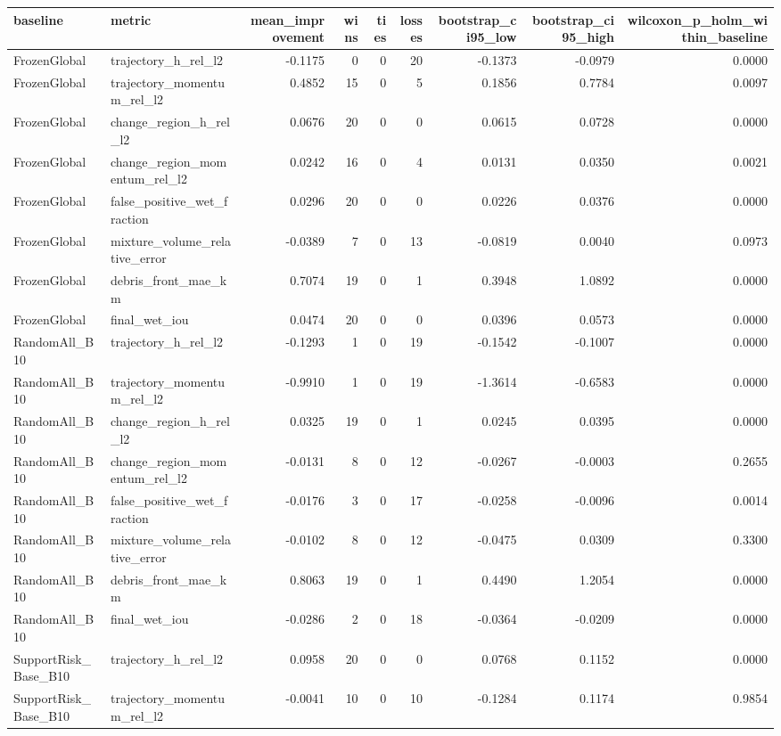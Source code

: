 \begin{tabular}{llrrrrrrr}
\toprule
baseline & metric & mean\_improvement & wins & ties & losses & bootstrap\_ci95\_low & bootstrap\_ci95\_high & wilcoxon\_p\_holm\_within\_baseline \\
\midrule
FrozenGlobal & trajectory\_h\_rel\_l2 & -0.1175 & 0 & 0 & 20 & -0.1373 & -0.0979 & 0.0000 \\
FrozenGlobal & trajectory\_momentum\_rel\_l2 & 0.4852 & 15 & 0 & 5 & 0.1856 & 0.7784 & 0.0097 \\
FrozenGlobal & change\_region\_h\_rel\_l2 & 0.0676 & 20 & 0 & 0 & 0.0615 & 0.0728 & 0.0000 \\
FrozenGlobal & change\_region\_momentum\_rel\_l2 & 0.0242 & 16 & 0 & 4 & 0.0131 & 0.0350 & 0.0021 \\
FrozenGlobal & false\_positive\_wet\_fraction & 0.0296 & 20 & 0 & 0 & 0.0226 & 0.0376 & 0.0000 \\
FrozenGlobal & mixture\_volume\_relative\_error & -0.0389 & 7 & 0 & 13 & -0.0819 & 0.0040 & 0.0973 \\
FrozenGlobal & debris\_front\_mae\_km & 0.7074 & 19 & 0 & 1 & 0.3948 & 1.0892 & 0.0000 \\
FrozenGlobal & final\_wet\_iou & 0.0474 & 20 & 0 & 0 & 0.0396 & 0.0573 & 0.0000 \\
RandomAll\_B10 & trajectory\_h\_rel\_l2 & -0.1293 & 1 & 0 & 19 & -0.1542 & -0.1007 & 0.0000 \\
RandomAll\_B10 & trajectory\_momentum\_rel\_l2 & -0.9910 & 1 & 0 & 19 & -1.3614 & -0.6583 & 0.0000 \\
RandomAll\_B10 & change\_region\_h\_rel\_l2 & 0.0325 & 19 & 0 & 1 & 0.0245 & 0.0395 & 0.0000 \\
RandomAll\_B10 & change\_region\_momentum\_rel\_l2 & -0.0131 & 8 & 0 & 12 & -0.0267 & -0.0003 & 0.2655 \\
RandomAll\_B10 & false\_positive\_wet\_fraction & -0.0176 & 3 & 0 & 17 & -0.0258 & -0.0096 & 0.0014 \\
RandomAll\_B10 & mixture\_volume\_relative\_error & -0.0102 & 8 & 0 & 12 & -0.0475 & 0.0309 & 0.3300 \\
RandomAll\_B10 & debris\_front\_mae\_km & 0.8063 & 19 & 0 & 1 & 0.4490 & 1.2054 & 0.0000 \\
RandomAll\_B10 & final\_wet\_iou & -0.0286 & 2 & 0 & 18 & -0.0364 & -0.0209 & 0.0000 \\
SupportRisk\_Base\_B10 & trajectory\_h\_rel\_l2 & 0.0958 & 20 & 0 & 0 & 0.0768 & 0.1152 & 0.0000 \\
SupportRisk\_Base\_B10 & trajectory\_momentum\_rel\_l2 & -0.0041 & 10 & 0 & 10 & -0.1284 & 0.1174 & 0.9854 \\

\end{tabular}
